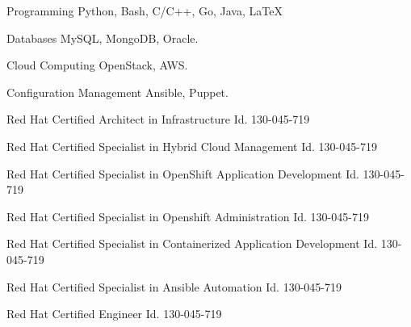

\begin{cvskills}

  \cvskill
    {Programming} %
    {Python, Bash, C/C++, Go, Java, LaTeX} %

  \cvskill
    {Databases} %
    {MySQL, MongoDB, Oracle.} %

  \cvskill
    {Cloud Computing} %
    {OpenStack, AWS.} %

  \cvskill
    {Configuration Management} %
    {Ansible, Puppet.} %

  \cvskill
    {Red Hat Certified Architect in Infrastructure} %
    {Id. 130-045-719} %

  \cvskill
    {Red Hat Certified Specialist in Hybrid Cloud Management} %
    {Id. 130-045-719} %

  \cvskill
    {Red Hat Certified Specialist in OpenShift Application Development} %
    {Id. 130-045-719} %

  \cvskill
    {Red Hat Certified Specialist in Openshift Administration} %
    {Id. 130-045-719} %

  \cvskill
    {Red Hat Certified Specialist in Containerized Application Development} %
    {Id. 130-045-719} %

  \cvskill
    {Red Hat Certified Specialist in Ansible Automation} %
    {Id. 130-045-719} %

  \cvskill
    {Red Hat Certified Engineer} %
    {Id. 130-045-719} %


\end{cvskills}
